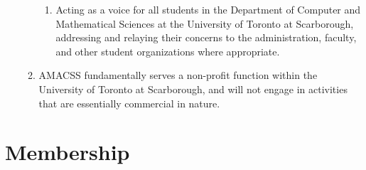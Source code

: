 \documentclass[12pt,a4paper]{article}
\begin{document}
\begin{enumerate}
\begin{enumerate}
\begin{enumerate}
\item Acting as a voice for all students in the Department of Computer and Mathematical Sciences at the University of Toronto at Scarborough, addressing and relaying their concerns to the administration, faculty, and other student organizations where appropriate.
\end{enumerate}

\item AMACSS fundamentally serves a non-profit function within the University of Toronto at Scarborough, and will not engage in activities that are essentially commercial in nature.
\end{enumerate}
\end{enumerate}

\section{Membership}
\end{document}
